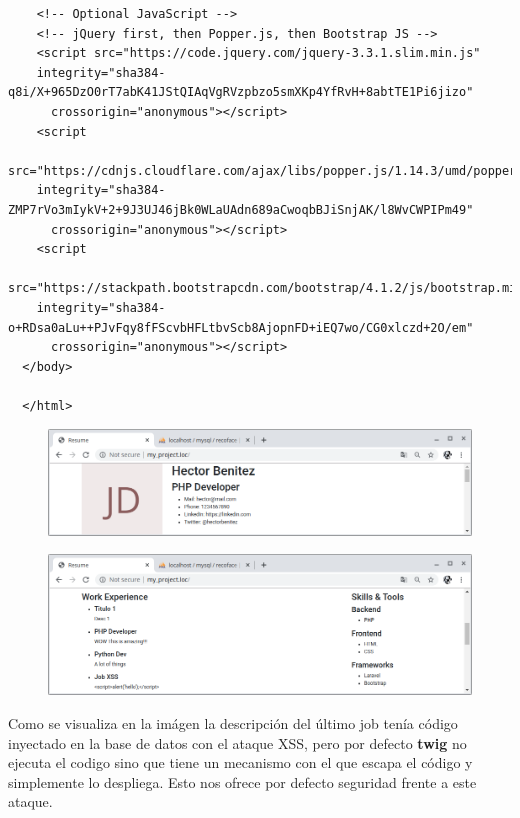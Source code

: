 \documentclass{article}
\begin{document}
\begin{verbatim}
    <!-- Optional JavaScript -->
    <!-- jQuery first, then Popper.js, then Bootstrap JS -->
    <script src="https://code.jquery.com/jquery-3.3.1.slim.min.js"
    integrity="sha384-q8i/X+965DzO0rT7abK41JStQIAqVgRVzpbzo5smXKp4YfRvH+8abtTE1Pi6jizo"
      crossorigin="anonymous"></script>
    <script
    src="https://cdnjs.cloudflare.com/ajax/libs/popper.js/1.14.3/umd/popper.min.js"
    integrity="sha384-ZMP7rVo3mIykV+2+9J3UJ46jBk0WLaUAdn689aCwoqbBJiSnjAK/l8WvCWPIPm49"
      crossorigin="anonymous"></script>
    <script
    src="https://stackpath.bootstrapcdn.com/bootstrap/4.1.2/js/bootstrap.min.js"
    integrity="sha384-o+RDsa0aLu++PJvFqy8fFScvbHFLtbvScb8AjopnFD+iEQ7wo/CG0xlczd+2O/em"
      crossorigin="anonymous"></script>
  </body>

  </html>
\end{verbatim}

\newpage

\begin{figure}[h!]
  \centering
  \includegraphics[scale=0.5]{./Pictures/155_twig_index_name.png}
\end{figure}

\begin{figure}[h!]
  \centering
  \includegraphics[scale=0.5]{./Pictures/155_twig_index_jobs.png}
\end{figure}

Como se visualiza en la imágen la descripción del último job tenía código
inyectado en la base de datos con el ataque XSS, pero por defecto \textbf{twig}
no ejecuta el codigo sino que tiene un mecanismo con el que escapa el código y
simplemente lo despliega. Esto nos ofrece por defecto seguridad frente a este
ataque.\\
\end{document}

